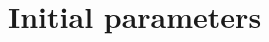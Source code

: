 \documentclass[
  journal=pasa,
  manuscript=research-paper, %
  year=2021,
  volume=37
]{cup-journal}
\begin{document}




\appendix

\section{Initial parameters}
\end{document}
